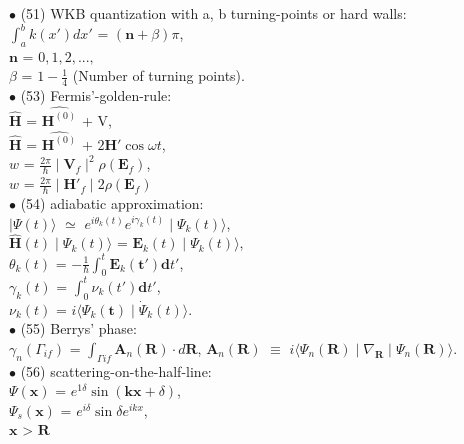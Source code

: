 \documentclass[10pt,fancy]{elegantbook}
\begin{document}
{$\bullet$ (51) WKB quantization with a, b turning-points or hard walls:  \\    
$\int_a^b k(x') dx'$ = $(\mathbf n + \beta) \pi$,  \\   
$\mathbf n$ = $0,1,2,...,$  \\
$\beta$ = $1 - \frac{1}{4}$ (Number of turning points). \\

$\bullet$ (53) Fermis'-golden-rule:  \\  
$\hat{\mathbf H}$ = $\hat{\mathbf H^{(0)}}$ + V, \\  
$\hat{\mathbf H}$ = $\hat{\mathbf H^{(0)}}$ + $2 \mathbf H' \cos \omega t$,  \\    
$w$ = $\frac{2 \pi}{\hbar} \mid \mathbf V_f \mid^2 \rho(\mathbf E_f)$,   \\
$w$ = $\frac{2 \pi}{\hbar} \mid \mathbf H'_f \mid 2 \rho(\mathbf E_f)$    \\

$\bullet$ (54) adiabatic approximation: \\ 
$\mid \Psi(t) \rangle$ $\simeq$ $e^{i \theta_k(t)} e^{i \gamma_k(t)} \mid \Psi_k(t) \rangle$,  \\  
$\hat{\mathbf H} (t) \mid \Psi_k(t) \rangle$ = $\mathbf E_k(t) \mid \Psi_k(t) \rangle$, \\   
$\theta_k(t)$ = $ -\frac{1}{\hbar} \int_0^t \mathbf E_k(\mathbf t') {\mathbf dt'}$, \\ 
$\gamma_k(t)$ = $\int_0^t \nu_k(t') {\mathbf dt'}$, \\ 
$\nu_k(t)$ = $i \langle  \Psi_k(\mathbf t) \mid {\dot \Psi_k}(t) \rangle$. \\

$\bullet$ (55) Berrys' phase:  \\
$\gamma_n(\Gamma_{if})$ = $\int_{\Gamma if} \mathbf A_n(\mathbf R) \cdot  d{\mathbf R}$, $ \mathbf A_n(\mathbf R)$ $\equiv$ $ i \langle \Psi_n(\mathbf R) \mid \nabla_{\mathbf R} \mid \Psi_n(\mathbf R) \rangle$. \\

$\bullet$ (56) scattering-on-the-half-line:  \\  
$\Psi(\mathbf x)$ = $e^{1 \delta} \sin(\mathbf {kx} + \delta)$,  \\   
$\Psi_s(\mathbf x)$ = $e^{i \delta} \sin \delta e^{ikx}$,  \\  
$\mathbf x$ > $ \mathbf R$  \\

}
\end{document}
